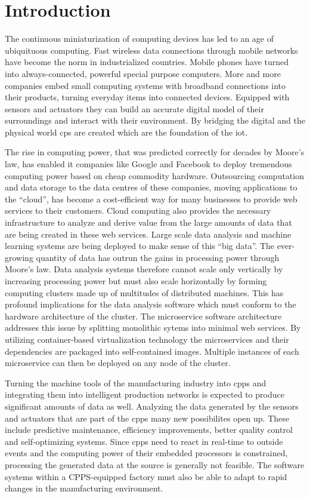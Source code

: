 \chapter{Introduction}
The continuous miniaturization of computing devices has led to an age of ubiquituous computing.
Fast wireless data connections through mobile networks have become the norm in industrialized countries.
Mobile phones have turned into always-connected, powerful special purpose computers.
More and more companies embed small computing systems with broadband connections into their products, turning everyday items into connected devices.
Equipped with sensors and actuators they can build an accurate digital model of their surroundings and interact with their environment.
By bridging the digital and the physical world \ac{cps} are created which are the foundation of the \ac{iot}.

The rise in computing power, that was predicted correctly for decades by Moore's law, has enabled \ac{it} companies like Google and Facebook to deploy tremendous computing power based on cheap commodity hardware.
Outsourcing computation and data storage to the data centres of these companies, moving applications to the \enquote{cloud}, has become a cost-efficient way for many businesses to provide web services to their customers.
Cloud computing also provides the necessary infrastructure to analyze and derive value from the large amounts of data that are being created in these web services.
Large scale data analysis and machine learning systems are being deployed to make sense of this \enquote{big data}.
The ever-growing quantity of data has outrun the gains in processing power through Moore's law.
Data analysis systems therefore cannot scale only vertically by increasing processing power but must also scale horizontally by forming computing clusters made up of multitudes of distributed machines.
This has profound implications for the data analysis software which must conform to the hardware architecture of the cluster.
The microservice software architecture addresses this issue by splitting monolithic sytems into minimal web services.
By utilizing container-based virtualization technology the microservices and their dependencies are packaged into self-contained images.
Multiple instances of each microservice can then be deployed on any node of the cluster.

Turning the machine tools of the manufacturing industry into \ac{cpps} and integrating them into intelligent production networks is expected to produce significant amounts of data as well.
Analyzing the data generated by the sensors and actuators that are part of the \ac{cpps} many new possibilites open up.
These include predictive maintenance, efficiency improvements, better quality control and self-optimizing systems.
Since \ac{cpps} need to react in real-time to outside events and the computing power of their embedded processors is constrained, processing the generated data at the source is generally not feasible.
The software systems within a CPPS-equipped factory must also be able to adapt to rapid changes in the manufacturing environment.

